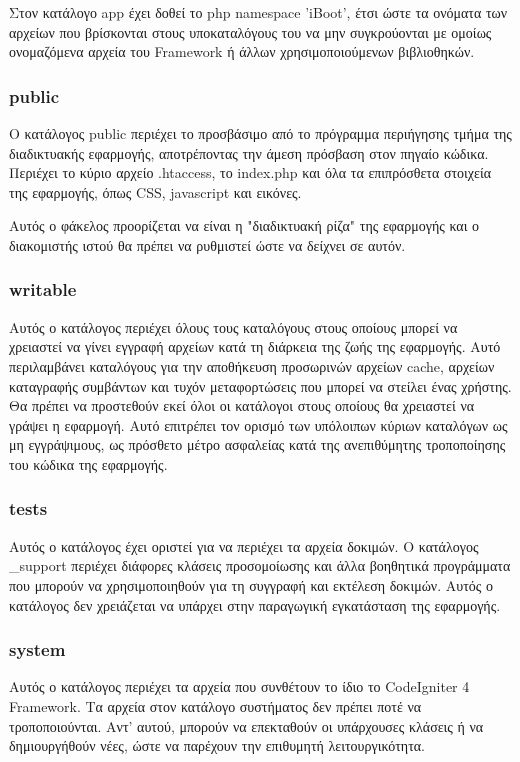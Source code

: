 Στον κατάλογο app έχει δοθεί το php namespace 'iBoot', έτσι ώστε τα ονόματα των αρχείων που βρίσκονται στους υποκαταλόγους του να μην συγκρούονται με ομοίως ονομαζόμενα αρχεία του Framework ή άλλων χρησιμοποιούμενων βιβλιοθηκών.

\subsubsection{public} \label{ui:public}
Ο κατάλογος public περιέχει το προσβάσιμο από το πρόγραμμα περιήγησης τμήμα της διαδικτυακής εφαρμογής, αποτρέποντας την άμεση πρόσβαση στον πηγαίο κώδικα. Περιέχει το κύριο αρχείο .htaccess, το index.php και όλα τα επιπρόσθετα στοιχεία της εφαρμογής, όπως CSS, javascript και εικόνες.

Αυτός ο φάκελος προορίζεται να είναι η "διαδικτυακή ρίζα" της εφαρμογής και ο διακομιστής ιστού θα πρέπει να ρυθμιστεί ώστε να δείχνει σε αυτόν.

\subsubsection{writable} \label{ui:writable}
Αυτός ο κατάλογος περιέχει όλους τους καταλόγους στους οποίους μπορεί να χρειαστεί να γίνει εγγραφή αρχείων κατά τη διάρκεια της ζωής της εφαρμογής. Αυτό περιλαμβάνει καταλόγους για την αποθήκευση προσωρινών αρχείων cache, αρχείων καταγραφής συμβάντων και τυχόν μεταφορτώσεις που μπορεί να στείλει ένας χρήστης. Θα πρέπει να προστεθούν εκεί όλοι οι κατάλογοι στους οποίους θα χρειαστεί να γράψει η εφαρμογή. Αυτό επιτρέπει τον ορισμό των υπόλοιπων κύριων καταλόγων ως μη εγγράψιμους, ως πρόσθετο μέτρο ασφαλείας κατά της ανεπιθύμητης τροποποίησης του κώδικα της εφαρμογής.

\subsubsection{tests} \label{ui:tests}
Αυτός ο κατάλογος έχει οριστεί για να περιέχει τα αρχεία δοκιμών. Ο κατάλογος \_support περιέχει διάφορες κλάσεις προσομοίωσης και άλλα βοηθητικά προγράμματα που μπορούν να χρησιμοποιηθούν για τη συγγραφή και εκτέλεση δοκιμών. Αυτός ο κατάλογος δεν χρειάζεται να υπάρχει στην παραγωγική εγκατάσταση της εφαρμογής.

\subsubsection{system} \label{ui:system}
Αυτός ο κατάλογος περιέχει τα αρχεία που συνθέτουν το ίδιο το CodeIgniter 4 Framework. Tα αρχεία στον κατάλογο συστήματος δεν πρέπει ποτέ να τροποποιούνται. Αντ' αυτού, μπορούν να επεκταθούν οι υπάρχουσες κλάσεις ή να δημιουργήθούν νέες, ώστε να παρέχουν την επιθυμητή λειτουργικότητα.


